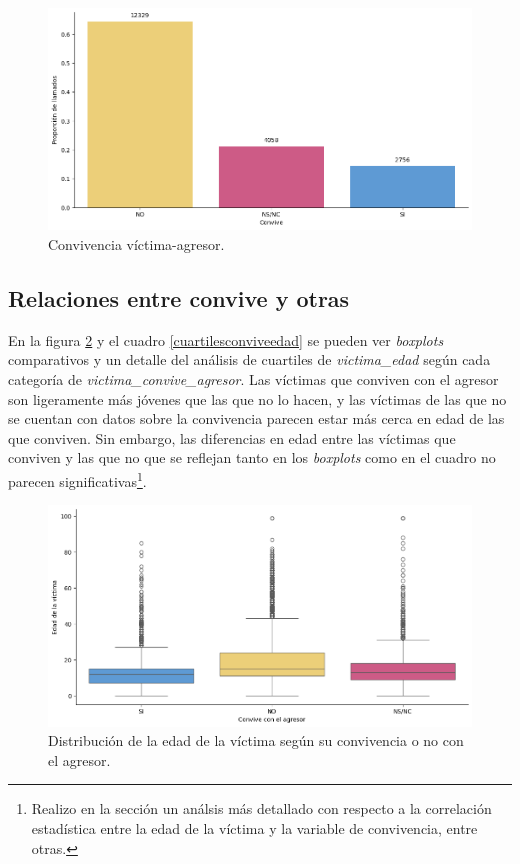 \documentclass[10 pt]{article}
\begin{document}
\begin{figure}[H]
    \begin{center}
    \includegraphics[scale=.5]{images/latex_convive.png}
    \caption{Convivencia víctima-agresor.}
    \label{convivencia}
    \end{center}
    \end{figure}


\subsection{Relaciones entre convive y otras}

En la figura \ref{boxplotsconvivenciaedad} y el cuadro \ref{cuartilesconviveedad} se pueden ver \textit{boxplots} comparativos y un detalle del análisis de cuartiles de \textit{victima\_edad} según cada categoría de \textit{victima\_convive\_agresor}. Las víctimas que conviven con el agresor son ligeramente más jóvenes que las que no lo hacen, y las víctimas de las que no se cuentan con datos sobre la convivencia parecen estar más cerca en edad de las que conviven. Sin embargo, las diferencias en edad entre las víctimas que conviven y las que no que se reflejan tanto en los \textit{boxplots} como en el cuadro no parecen significativas\footnote{Realizo en la sección  un análsis más detallado con respecto a la correlación estadística entre la edad de la víctima y la variable de convivencia, entre otras.}. 

\begin{figure}[H]
    \begin{center}
    \includegraphics[scale=.5]{images/latex_boxplot_convive_edad.png}
    \caption{Distribución de la edad de la víctima según su convivencia o no con el agresor.}
    \label{boxplotsconvivenciaedad}
    \end{center}
    \end{figure}
\end{document}
